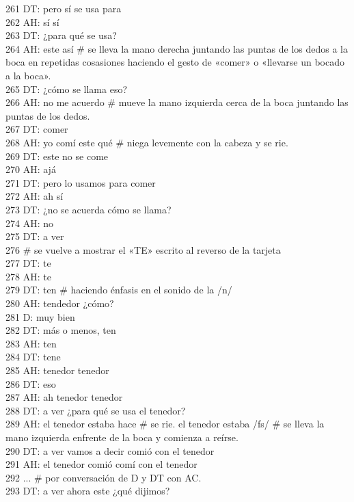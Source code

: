 261 DT: pero sí se usa para\\
262 AH: sí sí\\
263 DT: ¿para qué se usa?\\
264 AH: este así # se lleva la mano derecha juntando las puntas de los dedos a la boca en repetidas cosasiones haciendo el gesto de «comer» o «llevarse un bocado a la boca».\\
265 DT: ¿cómo se llama eso?\\
266 AH: no me acuerdo # mueve la mano izquierda cerca de la boca juntando las puntas de los dedos.\\
267 DT: comer\\
268 AH: yo comí este qué # niega levemente con la cabeza y se rie.\\
269 DT: este no se come\\
270 AH: ajá\\
271 DT: pero lo usamos para comer\\
272 AH: ah sí\\
273 DT: ¿no se acuerda cómo se llama?\\
274 AH: no\\
275 DT: a ver\\
276 # se vuelve a mostrar el «TE» escrito al reverso de la tarjeta\\
277 DT: te\\
278 AH: te\\
279 DT: ten # haciendo énfasis en el sonido de la /n/\\
280 AH: tendedor ¿cómo?\\
281 D: muy bien\\
282 DT: más o menos, ten\\
283 AH: ten\\
284 DT: tene\\
285 AH: tenedor tenedor\\
286 DT: eso\\
287 AH: ah tenedor tenedor \\
288 DT: a ver ¿para qué se usa el tenedor?\\
289 AH: el tenedor estaba hace # se rie. el tenedor estaba /fs/ # se lleva la mano izquierda enfrente de la boca y comienza a reírse.\\
290 DT: a ver vamos a decir comió con el tenedor\\
291 AH: el tenedor comió comí con el tenedor\\
292 ... # por conversación de D y DT con AC.\\
293 DT: a ver ahora este ¿qué dijimos?\\
